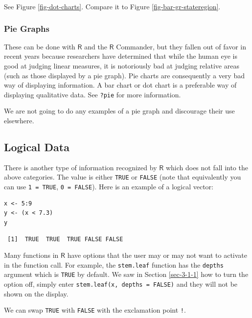 \documentclass[captions=tableheading]{scrbook}
\begin{document}
\begin{example}
See Figure \ref{fig-dot-charts}. Compare it to Figure \ref{fig-bar-gr-stateregion}.

\end{example}
\subsubsection{Pie Graphs}
\label{sec-3-1-4-5}
\label{par:Pie-Graphs}


These can be done with \(\mathsf{R}\) and the \(\mathsf{R}\) Commander, but they fallen out of favor in recent years because researchers have determined that while the human eye is good at judging linear measures, it is notoriously bad at judging relative areas (such as those displayed by a pie graph). Pie charts are consequently a very bad way of displaying information. A bar chart or dot chart is a preferable way of displaying qualitative data. See \texttt{?pie} for more information.

We are not going to do any examples of a pie graph and discourage their use elsewhere. 
\subsection{Logical Data}
\label{sec-3-1-5}
\label{sub-Logical-Data}


There is another type of information recognized by \(\mathsf{R}\) which does not fall into the above categories. The value is either \texttt{TRUE} or \texttt{FALSE} (note that equivalently you can use \texttt{1 = TRUE}, \texttt{0 = FALSE}). Here is an example of a logical vector:


\lstset{language=R}
\begin{lstlisting}
x <- 5:9
y <- (x < 7.3)
y
\end{lstlisting}

\begin{verbatim}
 [1]  TRUE  TRUE  TRUE FALSE FALSE
\end{verbatim}

Many functions in \(\mathsf{R}\) have options that the user may or may not want to activate in the function call. For example, the \texttt{stem.leaf} function has the \texttt{depths} argument which is \texttt{TRUE} by default. We saw in Section \ref{sec-3-1-1} how to turn the option off, simply enter \texttt{stem.leaf(x, depths = FALSE)} and they will not be shown on the display.

We can swap \texttt{TRUE} with \texttt{FALSE} with the exclamation point \texttt{!}.
\end{document}
